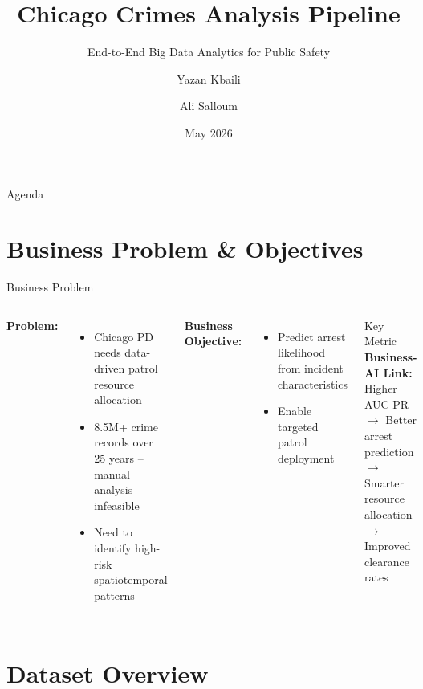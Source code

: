 \documentclass[10pt]{beamer}
\title[Chicago Crimes Pipeline]{Chicago Crimes Analysis Pipeline}
\subtitle{End-to-End Big Data Analytics for Public Safety}
\author[Team 2]{Yazan Kbaili \and Ali Salloum}
\institute[IU]{Innopolis University -- Big Data Course}
\date{May 2026}
\begin{document}

\begin{frame}
\titlepage
\end{frame}

\begin{frame}{Agenda}
\tableofcontents
\end{frame}

\section{Business Problem \& Objectives}

\begin{frame}{Business Problem}
\begin{columns}
\textbf{Problem:}
\begin{itemize}
    \item Chicago PD needs data-driven patrol resource allocation
    \item 8.5M+ crime records over 25 years -- manual analysis infeasible
    \item Need to identify high-risk spatiotemporal patterns
\end{itemize}
\vspace{0.3cm}
\textbf{Business Objective:}
\begin{itemize}
    \item Predict arrest likelihood from incident characteristics
    \item Enable targeted patrol deployment
\end{itemize}

\begin{block}{Key Metric}
\textbf{Business-AI Link:}
Higher AUC-PR $\rightarrow$ Better arrest prediction $\rightarrow$ Smarter resource allocation $\rightarrow$ Improved clearance rates
\end{block}
\end{columns}
\end{frame}

\section{Dataset Overview}
\end{document}
